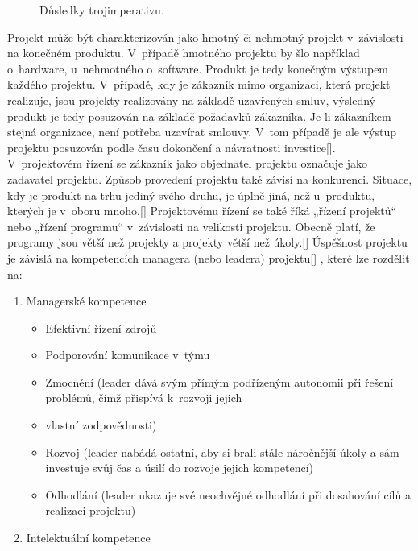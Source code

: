 \documentclass[
	11pt, oneside, printed, draft, 
	table,   %
	lof,     %
	lot     %
]{fithesis3}
\newcommand{\citepages}[2]{[\cite[#1]{#2}]}
\newcommand{\mezera}{\bigskip}
\begin{document}
{\begin{figure}[H]
\centering
\caption{Důsledky trojimperativu.}
\end{figure}

Projekt může být charakterizován jako hmotný či nehmotný projekt v~závislosti na konečném produktu. V~případě hmotného projektu by šlo například o~hardware, u~nehmotného o~software. Produkt je tedy konečným výstupem každého projektu.
V~případě, kdy je zákazník mimo organizaci, která projekt realizuje, jsou projekty realizovány na základě uzavřených smluv, výsledný produkt je tedy posuzován na základě požadavků zákazníka. Je-li zákazníkem stejná organizace, není potřeba uzavírat smlouvy. V~tom případě je ale výstup projektu posuzován podle času dokončení a návratnosti investice\citepages{10-12}{rosenau_2000}.  V~projektovém řízení se zákazník jako objednatel projektu označuje jako zadavatel projektu. Způsob provedení projektu také závisí na konkurenci. Situace, kdy je produkt na trhu jediný svého druhu, je úplně jiná, než u~produktu, kterých je v~oboru mnoho.\citepages{12}{rosenau_2000}
Projektovému řízení se také říká „řízení projektů“ nebo „řízení programu“ v~závislosti na velikosti projektu. Obecně platí, že programy jsou větší než projekty a projekty větší než úkoly.\citepages{12}{rosenau_2000}
Úspěšnost projektu je závislá na kompetencích managera (nebo leadera) projektu\citepages{1}{Muller2010437}%
, které lze rozdělit na: 
\mezera
\begin{enumerate}
\item Managerské kompetence
\begin{itemize}
\item Efektivní řízení zdrojů
\item Podporování komunikace v~týmu
\item Zmocnění (leader dává svým přímým podřízeným autonomii při řešení problémů, čímž přispívá k~rozvoji jejich \item vlastní zodpovědnosti)
\item Rozvoj (leader nabádá ostatní, aby si brali stále náročnější úkoly a sám investuje svůj čas a úsilí do rozvoje jejich kompetencí)
\item Odhodlání (leader ukazuje své neochvějné odhodlání při dosahování cílů a realizaci projektu)
\end{itemize}
\item Intelektuální kompetence
\begin{itemize}

\end{itemize}
\end{enumerate}}
\end{document}
